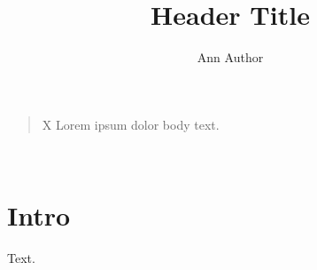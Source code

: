 \documentclass{article}
\title{Header Title}\author{Ann Author}
\begin{document}
\begin{quote}\vbox{\vbox{\hbox{X}}} Lorem ipsum dolor body text.\end{quote}

\begin{center}{\Large\@title}\\[1em]\@author\end{center}
\section{Intro}
Text.
\end{document}
